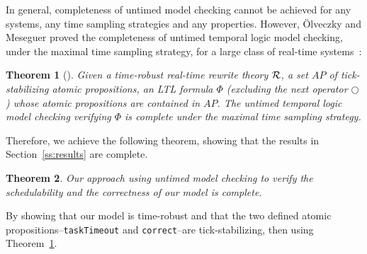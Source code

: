 \documentclass[10pt,journal]{IEEEtran}
\newtheorem{theorem}{Theorem}
\begin{document}
In general, completeness of untimed model checking cannot be achieved
for any systems, any time sampling strategies and any
properties. However, \"Olveczky and Meseguer proved the completeness
of untimed temporal logic model checking, under the maximal time
sampling strategy, for a large class of real-time
systems~\cite{DBLP:journals/entcs/OlveczkyM07a}:
\begin{theorem}[\cite{DBLP:journals/entcs/OlveczkyM07a}]
\label{t:completeness}
Given a \emph{time-robust} real-time rewrite theory $\cal R$, a set
$AP$ of \emph{tick-stabilizing} atomic propositions, an LTL formula
$\Phi$ (excluding the \emph{next} operator $\bigcirc$) whose atomic
propositions are contained in $AP$. The untimed temporal logic model
checking verifying $\Phi$ is \emph{complete} under the maximal time
sampling strategy.
\end{theorem}

Therefore, we achieve the following theorem, showing that the results
in Section~\ref{ss:results} are complete.
\begin{theorem} 
Our approach using untimed model checking to verify the schedulability
and the correctness of our model is complete.
\end{theorem}
\begin{IEEEproof}
By showing that our model is time-robust and that the two defined
atomic propositions--\verb|taskTimeout| and \verb|correct|--are
tick-stabilizing, then using Theorem~\ref{t:completeness}.
\end{IEEEproof}
\end{document}
